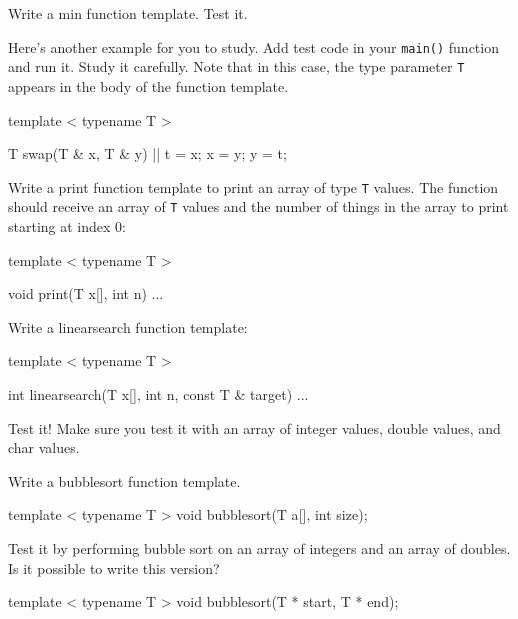 \begin{ex}
Write a min function template. Test it.

Here's another example for you to study. Add test code in your \texttt{main()} function and run it. Study it carefully. Note that in this case, the type parameter \texttt{T} appears in the body of the function template.

\begin{consolethree}[escapeinside=||]
template  < typename T >

T swap(T & x, T & y)
{    
     || t = x;
     x = y;
     y = t;
} 
\end{consolethree}
\end{ex}
\begin{ex}
Write a print function template to print an array of type \texttt{T} values. The function should receive an array of \texttt{T} values and the number of things in the array to print starting at index 0:

\begin{console}
template  < typename T >

void print(T x[], int n)
{    
     ...
} 
\end{console}
\end{ex}

\begin{ex}
Write a linearsearch function template:

\begin{console}
template  < typename T >

int linearsearch(T x[], int n, const T & target)
{
     ...
} 
\end{console}

Test it! Make sure you test it with an array of integer values, double
values, and char values.
\end{ex}
\begin{ex}
Write a bubblesort function template.

\begin{console}
template  < typename T >
void bubblesort(T a[], int size); 
\end{console}

Test it by performing bubble sort on an array of integers and an array of doubles. Is it possible to write this version?

\begin{console}
template  < typename T >
void bubblesort(T * start, T * end); 
\end{console}
\end{ex}

